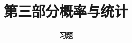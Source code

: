 



\title[Probability \& Statistics]{\LARGE \bfseries 第三部分\quad 概率与统计} %
\author[Exercises] %
{\Large \bfseries 习题}
\date{}






\begin{frame}

\titlepage %

\end{frame}





